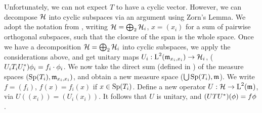 Unfortunately, we can not expect $T$ to have a cyclic vector. However, we can 
decompose $\mathcal{H}$ into cyclic subspaces via an argument using Zorn's Lemma.
We adopt the notation from \cite[pp. 337]{WernerFunkAna}, writing
$\mathcal{H} = \bigoplus_2 \mathcal{H}_i$, $x = (x_i)$ for a sum of pairwise orthogonal subspaces, such that
the closure of the span is the whole space. Once we have a decomposition
$\mathcal{H} = \bigoplus_2 \mathcal{H}_i$ into cyclic subspaces, we apply the 
considerations above, and get
unitary maps $U_i : \text{L}^2(\mathfrak{m}_{x_i, x_i}) \to \mathcal{H}_i$, 
($U_i T_i U_i ^{*})\phi_i = f_i \cdot \phi_i$. We now take the direct sum
(defined in \cite[214L]{FremMeasureTheo}) of the measure spaces $(\operatorname{Sp}(T_i), \mathfrak{m}_{x_i,x_i})$,
and obtain a new measure space ($\bigcup \operatorname{Sp}(T_i),\mathfrak{m}_{}$).
We write $f = (f_i)$, $f(x) = f_i(x)$ if $x \in \operatorname{Sp}(T_i)$. 
Define a new operator $U:\mathcal{H} \to \text{L}^2(\mathfrak{m}_{})$, via 
$U((x_i)) = (U_i(x_i))$. It follows that $U$ is unitary, and 
$(UTU^{*})(\phi) = f\phi$.

























